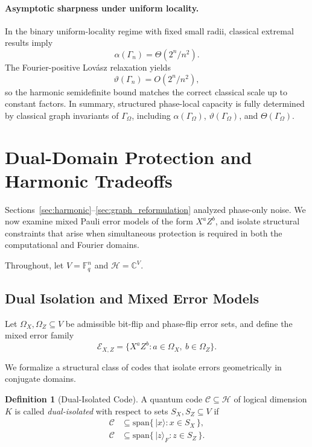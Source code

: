 \documentclass[a4paper,twocolumn,11pt,allowtoday]{quantumarticle}
\theoremstyle{plain}
\theoremstyle{definition}
\newtheorem{definition}[theorem]{Definition}
\theoremstyle{remark}
\begin{document}
\paragraph{Asymptotic sharpness under uniform locality.}
In the binary uniform-locality regime with fixed small radii, classical extremal results imply
\[
\alpha(\Gamma_n)=\Theta(2^n/n^2).
\]
The Fourier-positive Lovász relaxation yields
\[
\vartheta(\Gamma_n)=O(2^n/n^2),
\]
so the harmonic semidefinite bound matches the correct classical scale up to constant factors. In summary, structured phase-local capacity is fully determined by classical graph invariants of $\Gamma_\Omega$, including $\alpha(\Gamma_\Omega)$, $\vartheta(\Gamma_\Omega)$, and $\Theta(\Gamma_\Omega)$.




\section{Dual-Domain Protection and Harmonic Tradeoffs}
\label{sec:dual_tradeoffs}

Sections~\ref{sec:harmonic}--\ref{sec:graph_reformulation}
analyzed phase-only noise. 
We now examine mixed Pauli error models of the form
$X^a Z^b$, and isolate structural constraints that arise when
simultaneous protection is required in both the computational
and Fourier domains.

Throughout, let $V=\mathbb{F}_q^n$ and $\mathcal{H}=\mathbb{C}^{V}$.

\subsection{Dual Isolation and Mixed Error Models}
\label{subsec:dual_isolation}

Let $\Omega_X,\Omega_Z \subseteq V$ be admissible bit-flip and phase-flip
error sets, and define the mixed error family
\[
\mathcal{E}_{X,Z}
=
\{ X^a Z^b : a\in\Omega_X,\ b\in\Omega_Z \}.
\]

We formalize a structural class of codes that isolate
errors geometrically in conjugate domains.

\begin{definition}[Dual-Isolated Code]
A quantum code $\mathcal{C} \subseteq \mathcal{H}$ of logical
dimension $K$ is called \emph{dual-isolated}
with respect to sets $S_X,S_Z \subseteq V$ if
\[
\begin{aligned}
\mathcal{C}
&\subseteq
\mathrm{span}\{\,|x\rangle : x\in S_X\,\},\\
\mathcal{C}
&\subseteq
\mathrm{span}\{\,|z\rangle_F : z\in S_Z\,\}.
\end{aligned}
\]
\end{definition}
\end{document}

